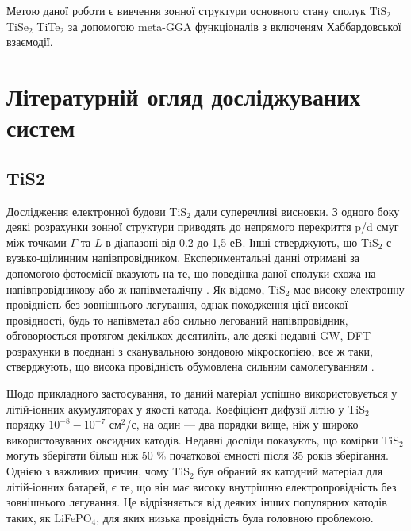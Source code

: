 Метою даної роботи є вивчення зонної структури основного стану сполук TiS$_2$ TiSe$_2$ TiTe$_2$ за допомогою meta-GGA функціоналів з включеням Хаббардовської взаємодії. 

\section{Літературній огляд досліджуваних систем}
\subsection{TiS2}
Дослідження електронної будови TiS$_{2}$ дали суперечливі висновки. З одного боку деякі розрахунки зонної структури приводять до непрямого перекриття p/d смуг між точками $\Gamma$ та $L$ в діапазоні від 0.2 до 1,5 еВ. Інші стверджують, що TiS$_{2}$ є вузько-щілинним напівпровідником. Експериментальні данні отримані за допомогою фотоемісії вказують на те, що поведінка даної сполуки схожа на напівпровідникову \cite{semiconducter} або ж напівметалічну \cite{semimetal}. Як відомо, TiS$_{2}$ має високу електронну провідність без зовнішнього легування, однак походження цієї високої провідності, будь то напівметал або сильно легований напівпровідник, обговорюється протягом декількох десятиліть, але деякі недавні GW, DFT розрахунки в поєднані з сканувальною зондовою мікроскопією, все ж таки, стверджують, що висока провідність обумовлена сильним самолегуванням \cite{semimetal_or_semiconducter}. 

Щодо прикладного застосування, то даний матеріал успішно використовується у літій-іонних акумуляторах у якості катода. Коефіцієнт дифузії літію у TiS$_2$ порядку $10^{-8}-10^{-7}$ см$^2$/с, на один --- два порядки вище, ніж у широко використовуваних оксидних катодів. Недавні досліди показують, що комірки TiS$_2$ могуть зберігати більш ніж 50 \% початкової ємності після 35 років зберігання. Однією з важливих причин, чому TiS$_2$ був обраний як катодний матеріал для літій-іонних батарей, є те, що він має високу внутрішню електропровідність без зовнішнього легування. Це відрізняється від деяких інших популярних катодів таких, як LiFePO$_4$, для яких низька провідність була головною проблемою.

